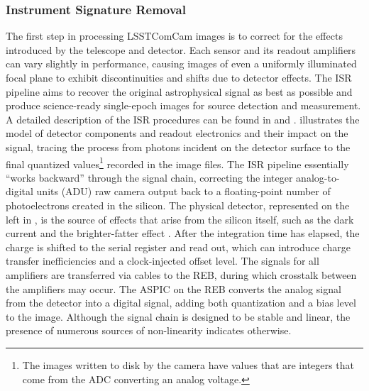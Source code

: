 \subsubsection{Instrument Signature Removal}
\label{ssec:isr}
The first step in processing \gls{LSSTComCam} images is to correct for the effects introduced by the telescope and detector.
Each sensor and its readout amplifiers can vary slightly in performance, causing images of even a uniformly illuminated focal plane to exhibit discontinuities and shifts due to detector effects.
The \gls{ISR} pipeline aims to recover the original astrophysical signal as best as possible and produce science-ready single-epoch images for source detection and measurement.
A detailed description of the \gls{ISR} procedures can be found in \citet{SITCOMTN-086} and \citet{2025JATIS..11a1209P}.
 illustrates the model of detector components and readout electronics and their impact on the signal, tracing the process from photons incident on the detector surface to the final quantized values\footnote{The images written to disk by the camera have values that are integers that come from the ADC converting an analog voltage.} recorded in the image files.
The \gls{ISR} \gls{pipeline} essentially ``works backward'' through the signal chain, correcting the integer analog-to-digital units (ADU) raw camera output back to a floating-point number of photoelectrons created in the silicon.
The physical detector, represented on the left in  , is the source of effects that arise from the silicon itself, such as the dark current and the brighter-fatter effect \citep{doi:10.1088/1538-3873/aab820,2024PASP..136d5003B}.
After the integration time has elapsed, the charge is shifted  to the serial register and read out, which can introduce charge transfer inefficiencies and a clock-injected offset level.
The signals for all amplifiers are transferred via cables to the \gls{REB}, during which crosstalk between the amplifiers may occur.
The \gls{ASPIC} on the \gls{REB} converts the analog signal from the detector into a digital signal, adding both quantization and a bias level to the image.
Although the signal chain is designed to be stable and linear, the presence of numerous sources of non-linearity indicates otherwise.

